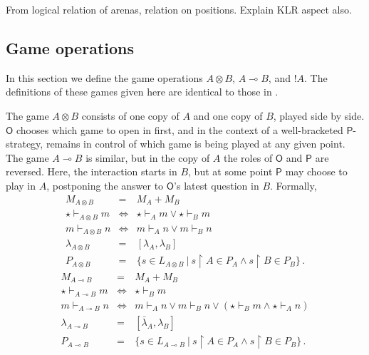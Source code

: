 \documentclass[acmsmall,anonymous]{acmart}
\newcommand{\kw}[1]{\ensuremath{ \textsf{#1} }}
\begin{document}
From logical relation of arenas, relation on positions.
Explain KLR aspect also.


\subsection{Game operations} %
\label{sec:gameop}

In this section we define the game operations
$A \otimes B$, $A \multimap B$, and $!A$.
The definitions of these games given here
are identical to those in \citep{gamesem99}.

The game $A \otimes B$ consists of one copy of $A$ and one copy of $B$,
played side by side.
\kw{O} chooses which game to open in first,
and in the context of a well-bracketed \kw{P}-strategy,
remains in control of which game is being played at any given point.
The game $A \multimap B$ is similar,
but in the copy of $A$ the roles of $\kw{O}$ and $\kw{P}$ are reversed.
Here, the interaction starts in $B$,
but at some point \kw{P} may choose to play in $A$,
postponing the answer to \kw{O}'s latest question in $B$.
Formally,
\[
  \begin{array}{rcl}
    M_{A \otimes B} & = & M_A + M_B \\
    \star \vdash_{A \otimes B} m & \Leftrightarrow &
        \star \vdash_A m \vee
        \star \vdash_B m \\
    m \vdash_{A \otimes B} n & \Leftrightarrow &
        m \vdash_A n \vee
        m \vdash_B n \\
    \lambda_{A \otimes B} & = & [\lambda_A, \lambda_B] \\
    P_{A \otimes B} & = &
        \{ s \in L_{A \otimes B} \:|\:
           s \upharpoonright A \in P_A \wedge s \upharpoonright B \in P_B \} \,.
  \end{array}
\]
\[
  \begin{array}{rcl}
    M_{A \multimap B} & = & M_A + M_B \\
    \star \vdash_{A \multimap B} m & \Leftrightarrow & \star \vdash_B m \\
    m \vdash_{A \multimap B} n & \Leftrightarrow &
        m \vdash_A n \vee m \vdash_B n \vee
        (\star \vdash_B m \wedge \star \vdash_A n) \\
    \lambda_{A \multimap B} & = & [\bar{\lambda}_A, \lambda_B] \\
    P_{A \multimap B} & = &
        \{ s \in L_{A \multimap B} \:|\:
           s \upharpoonright A \in P_A \wedge s \upharpoonright B \in P_B \} \,.
  \end{array}
\]
\end{document}

